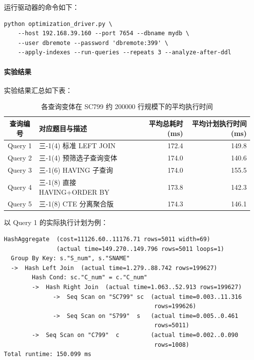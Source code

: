 \documentclass[12pt,a4paper]{ctexart}
\begin{document}
运行驱动器的命令如下：

\begin{verbatim}
python optimization_driver.py \
    --host 192.168.39.160 --port 7654 --dbname mydb \
    --user dbremote --password 'dbremote:399' \
    --apply-indexes --run-queries --repeats 3 --analyze-after-ddl
\end{verbatim}

\paragraph{实验结果}

实验结果汇总如下表：

\begin{table}[H]
\centering
\caption{各查询变体在 SC799 约 200000 行规模下的平均执行时间}
\label{tab:opt}
\begin{tabular}{clrr}
\toprule
查询编号 & 对应题目与描述 & 平均总耗时 (ms) & 平均计划执行时间 (ms) \\
\midrule
Query 1 & 三-1(4) 标准 LEFT JOIN & 172.4 & 149.8 \\
Query 2 & 三-1(4) 预筛选子查询变体 & 174.0 & 140.6 \\
Query 3 & 三-1(6) HAVING 子查询 & 174.0 & 155.5 \\
Query 4 & 三-1(8) 直接 HAVING+ORDER BY & 173.8 & 142.3 \\
Query 5 & 三-1(8) CTE 分离聚合版 & 174.3 & 146.1 \\
\bottomrule
\end{tabular}
\end{table}

以 Query 1 的实际执行计划为例：

\begin{verbatim}
HashAggregate  (cost=11126.60..11176.71 rows=5011 width=69)
               (actual time=149.270..149.796 rows=5011 loops=1)
  Group By Key: s."S_num", s."SNAME"
  ->  Hash Left Join  (actual time=1.279..88.742 rows=199627)
        Hash Cond: sc."C_num" = c."C_num"
        ->  Hash Right Join  (actual time=1.063..52.913 rows=199627)
              ->  Seq Scan on "SC799" sc  (actual time=0.003..11.316
                                           rows=199626)
              ->  Seq Scan on "S799"  s   (actual time=0.005..0.461
                                           rows=5011)
        ->  Seq Scan on "C799"  c         (actual time=0.002..0.090
                                           rows=1008)
Total runtime: 150.099 ms
\end{verbatim}
\end{document}
